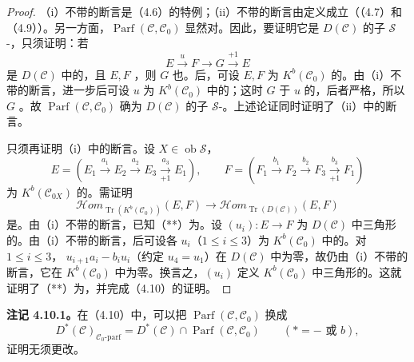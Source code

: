 \begin{proof}
（i）不带的断言是（4.6）的特例；（ii）不带的断言由定义成立（（4.7）和（4.9））。另一方面，$\operatorname{Parf}(\mathcal C,\mathcal C_0)$ 显然对。因此，要证明它是 $D(\mathcal C)$ 的子 $\mathscr S$-，只须证明：若
\[E\xrightarrow{u}F\longrightarrow G\xrightarrow{+1}E\tag{*}\]
是 $D(\mathcal C)$ 中的，且 $E,F$ ，则 $G$
也。后，可设 $E,F$ 为 $K^b(\mathcal C_0)$ 的。由（i）不带的断言，进一步后可设 $u$ 为 $K^b(\mathcal C_0)$ 中的；这时 $G$ 于 $u$ 的，后者严格，所以 $G$ 。故 $\operatorname{Parf}(\mathcal C,\mathcal C_0)$ 确为 $D(\mathcal C)$ 的子 $\mathscr S$-。上述论证同时证明了（ii）中的断言。

只须再证明（i）中的断言。设 $X\in\operatorname{ob}\mathscr S$，
\[
E=(E_1\xrightarrow{a_1}E_2\xrightarrow{a_2}E_3\xrightarrow[+1]{a_3}E_1),\qquad
F=(F_1\xrightarrow{b_1}F_2\xrightarrow{b_2}F_3\xrightarrow[+1]{b_3}F_1)
\]
为 $K^b(\mathcal C_{0X})$ 的。需证明
\[\mathcal Hom_{\operatorname{Tr}(K^b(\mathcal C_0))}(E,F)\longrightarrow
\mathcal Hom_{\operatorname{Tr}(D(\mathcal C))}(E,F)\tag{**}\]
是。由（i）不带的断言，已知（**）为。设 $(u_i):E\to F$ 为 $D(\mathcal C)$ 中三角形的。由（i）不带的断言，后可设各 $u_i$（$1\leq i\leq3$）为 $K^b(\mathcal C_0)$ 中的。对 $1\leq i\leq3$， $u_{i+1}a_i-b_iu_i$（约定 $u_4=u_1$）在 $D(\mathcal C)$ 中为零，故仍由（i）不带的断言，它在 $K^b(\mathcal C_0)$ 中为零。换言之，$(u_i)$ 定义 $K^b(\mathcal C_0)$ 中三角形的。这就证明了（**）为，并完成（4.10）的证明。
\end{proof}

\textbf{注记 4.10.1。}在（4.10）中，可以把 $\operatorname{Parf}(\mathcal C,\mathcal C_0)$ 换成
\[D^*(\mathcal C)_{\mathcal C_0\text{-parf}}=D^*(\mathcal C)\cap\operatorname{Parf}(\mathcal C,\mathcal C_0)\qquad(*=-\text{ 或 }b),\]
证明无须更改。

